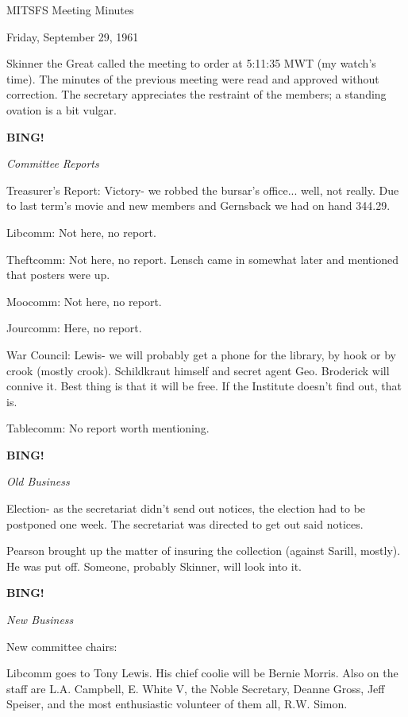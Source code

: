 \documentclass[12pt]{article}
\newcommand{\bing}{{\bf BING!} }
\newcommand{\goto}[1]{\bing \vskip 12pt \centerline{{\em{#1}}}}
\begin{document}
\begin{center}

MITSFS Meeting Minutes

Friday, September 29, 1961

\end{center}
 
\vspace{12pt}

\setlength{\parskip}{6pt}

\noindent
Skinner the Great called the meeting to order at 5:11:35 MWT (my watch's time). The minutes of the previous meeting were read and approved without correction. The secretary appreciates the restraint of the members; a standing ovation is a bit vulgar.

\goto{Committee Reports}

Treasurer's Report: Victory- we robbed the bursar's office... well, not really. Due to last term's movie and new members and Gernsback we had on hand 344.29.

Libcomm: Not here, no report.

Theftcomm: Not here, no report. Lensch came in somewhat later and mentioned that posters were up.

Moocomm: Not here, no report.

Jourcomm: Here, no report.

War Council: Lewis- we will probably get a phone for the library, by hook or by crook (mostly crook). Schildkraut himself and secret agent Geo. Broderick will connive it. Best thing is that it will be free. If the Institute doesn't find out, that is.

Tablecomm: No report worth mentioning.

\goto{Old Business}

Election- as the secretariat didn't send out notices, the election had to be postponed one week. The secretariat was directed to get out said notices.

Pearson brought up the matter of insuring the collection (against Sarill, mostly). He was put off. Someone, probably Skinner, will look into it.

\goto{New Business}

New committee chairs:

Libcomm goes to Tony Lewis. His chief coolie will be Bernie Morris. Also on the staff are L.A. Campbell, E. White V, the Noble Secretary, Deanne Gross, Jeff Speiser, and the most enthusiastic volunteer of them all, R.W. Simon.
\end{document}
